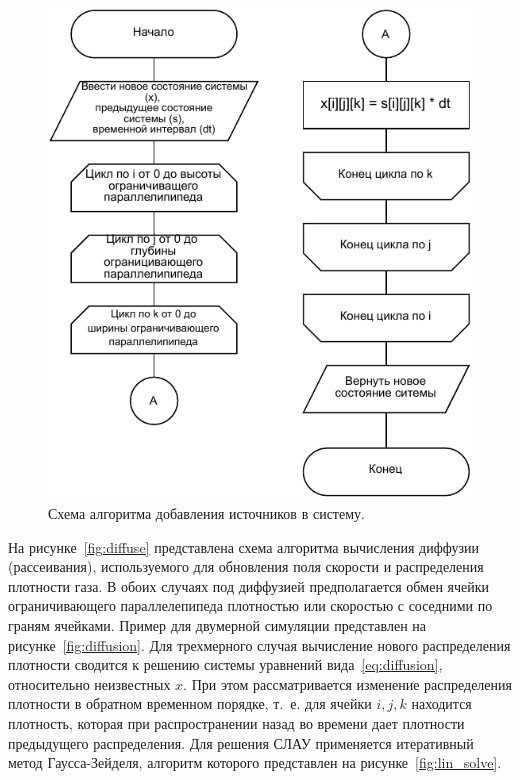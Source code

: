 \begin{figure}[H]
	\centering
	\includegraphics[width=1.0\textwidth, page=1]{assets/img/add_source.pdf}
	\caption{Схема алгоритма добавления источников в систему.}
	\label{fig:add_src}
\end{figure}

На рисунке~\ref{fig:diffuse} представлена схема алгоритма вычисления диффузии (рассеивания), используемого для обновления поля скорости и распределения плотности газа. В обоих случаях под диффузией предполагается обмен ячейки ограничивающего параллелепипеда плотностью или скоростью с соседними по граням ячейками. Пример для двумерной симуляции представлен на рисунке~\ref{fig:diffusion}. Для трехмерного случая вычисление нового распределения плотности сводится к решению системы уравнений вида~\ref{eq:diffusion}, относительно неизвестных $x$. При этом рассматривается изменение распределения плотности в обратном временном порядке, т.~е. для ячейки $i, j, k$ находится плотность, которая при распространении назад во времени дает плотности предыдущего распределения. Для решения СЛАУ применяется итеративный метод Гаусса-Зейделя, алгоритм которого представлен на рисунке~\ref{fig:lin_solve}.

